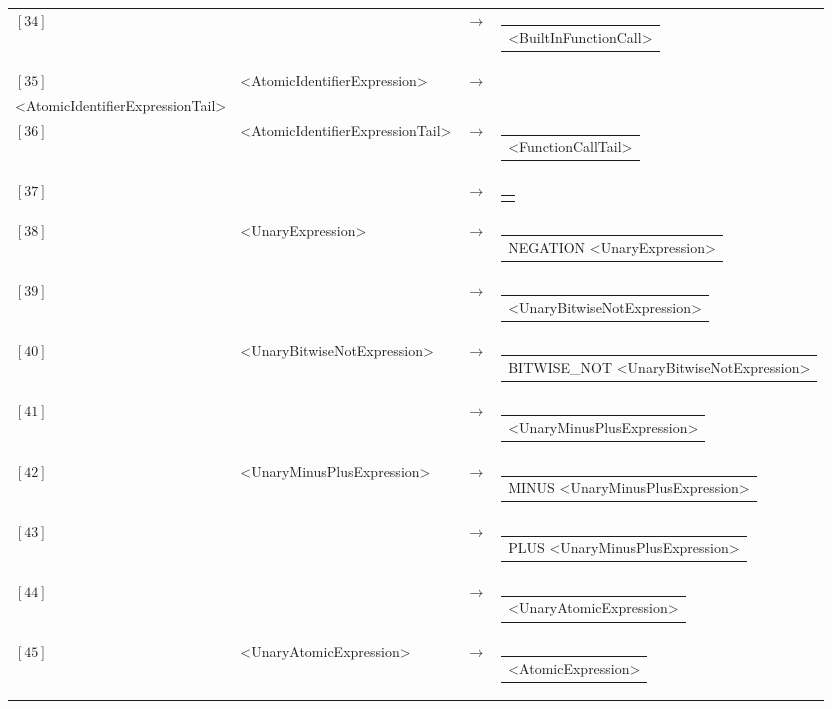 \documentclass[a4paper,10pt]{article}
\begin{document}
\begin{longtable}{llll}
$[34]$&&$\rightarrow$&\begin{tabular}[t]{@{}l@{}}<BuiltInFunctionCall> \end{tabular}\\
$[35]$&<AtomicIdentifierExpression>&$\rightarrow$&\begin{tabular}[t]{@{}l@{}}IDENTIFIER \\<AtomicIdentifierExpressionTail> \end{tabular}\\
$[36]$&<AtomicIdentifierExpressionTail>&$\rightarrow$&\begin{tabular}[t]{@{}l@{}}<FunctionCallTail> \end{tabular}\\
$[37]$&&$\rightarrow$&\begin{tabular}[t]{@{}l@{}}$\epsilon$ \end{tabular}\\
$[38]$&<UnaryExpression>&$\rightarrow$&\begin{tabular}[t]{@{}l@{}}NEGATION <UnaryExpression> \end{tabular}\\
$[39]$&&$\rightarrow$&\begin{tabular}[t]{@{}l@{}}<UnaryBitwiseNotExpression> \end{tabular}\\
$[40]$&<UnaryBitwiseNotExpression>&$\rightarrow$&\begin{tabular}[t]{@{}l@{}}BITWISE\_NOT <UnaryBitwiseNotExpression> \end{tabular}\\
$[41]$&&$\rightarrow$&\begin{tabular}[t]{@{}l@{}}<UnaryMinusPlusExpression> \end{tabular}\\
$[42]$&<UnaryMinusPlusExpression>&$\rightarrow$&\begin{tabular}[t]{@{}l@{}}MINUS <UnaryMinusPlusExpression> \end{tabular}\\
$[43]$&&$\rightarrow$&\begin{tabular}[t]{@{}l@{}}PLUS <UnaryMinusPlusExpression> \end{tabular}\\
$[44]$&&$\rightarrow$&\begin{tabular}[t]{@{}l@{}}<UnaryAtomicExpression> \end{tabular}\\
$[45]$&<UnaryAtomicExpression>&$\rightarrow$&\begin{tabular}[t]{@{}l@{}}<AtomicExpression> \end{tabular}\\

\end{longtable}
\end{document}
